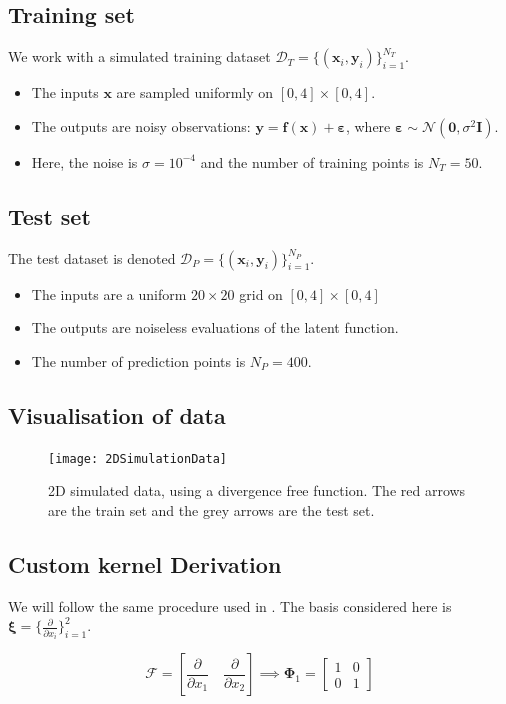 \documentclass[12pt,a4paper,twoside]{report}
\theoremstyle{definition}
\begin{document}
\subsection{Training set}
We work with a simulated training dataset $\mathcal{D}_T = \{(\mathbf x_i, \mathbf y_i)\}_{i=1}^{N_T}$.
\begin{itemize}
	\item The inputs $\mathbf{x}$ are sampled uniformly on $[0, 4]\times [0,4]$.
	\item The outputs are noisy observations: $\mathbf y = \mathbf f(\mathbf x)+\boldsymbol \varepsilon$, where $\boldsymbol \varepsilon \sim \mathcal N(\mathbf 0,\sigma^2 \mathbf I)$. 
	\item Here, the noise is $\sigma =10^{-4}$ and the number of training points is $N_T=50$.
\end{itemize}


\subsection{Test set}
The test dataset is denoted $\mathcal{D}_P = \{(\mathbf x_i, \mathbf y_i)\}_{i=1}^{N_P}$.
\begin{itemize}
	\item The inputs are a uniform $20\times 20$ grid on $[0,4]\times [0,4]$
	\item The outputs are noiseless evaluations of the latent function. 
	\item The number of prediction points is $N_P=400$.
\end{itemize}

\subsection{Visualisation of data}
\begin{figure}[ht]
	\centering
	\texttt{[image: 2DSimulationData]}
	\caption[2D data]{2D simulated data, using a divergence free function. The red arrows are the train set and the grey arrows are the test set.}
\end{figure}

\subsection{Custom kernel Derivation}
We will follow the same procedure used in . The basis considered here is $\boldsymbol \xi = \{\frac{\partial}{\partial x_i}\}_{i=1}^2$.

$$\mathscr F = \left[ \frac{\partial }{\partial x_1}\quad \frac{\partial }{\partial x_2} \right]\implies \boldsymbol \Phi_1 = \begin{bmatrix} 1&0\\0&1 \end{bmatrix} $$
\end{document}
